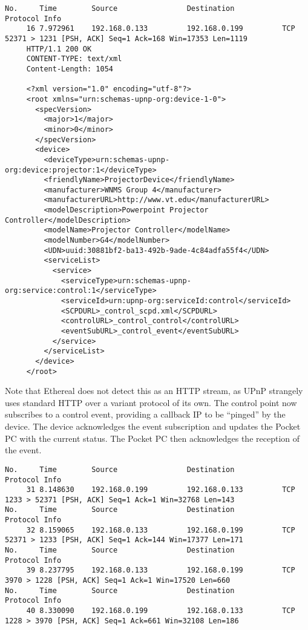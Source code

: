 \documentclass[11pt]{report}
\begin{document}
\begin{verbatim}
No.     Time        Source                Destination           Protocol Info
     16 7.972961    192.168.0.133         192.168.0.199         TCP      52371 > 1231 [PSH, ACK] Seq=1 Ack=168 Win=17353 Len=1119
     HTTP/1.1 200 OK
     CONTENT-TYPE: text/xml
     Content-Length: 1054

     <?xml version="1.0" encoding="utf-8"?>
     <root xmlns="urn:schemas-upnp-org:device-1-0">
       <specVersion>
         <major>1</major>
         <minor>0</minor>
       </specVersion>
       <device>
         <deviceType>urn:schemas-upnp-org:device:projector:1</deviceType>
         <friendlyName>ProjectorDevice</friendlyName>
         <manufacturer>WNMS Group 4</manufacturer>
         <manufacturerURL>http://www.vt.edu</manufacturerURL>
         <modelDescription>Powerpoint Projector Controller</modelDescription>
         <modelName>Projector Controller</modelName>
         <modelNumber>G4</modelNumber>
         <UDN>uuid:30881bf2-ba13-492b-9ade-4c84adfa55f4</UDN>
         <serviceList>
           <service>
             <serviceType>urn:schemas-upnp-org:service:control:1</serviceType>
             <serviceId>urn:upnp-org:serviceId:control</serviceId>
             <SCPDURL>_control_scpd.xml</SCPDURL>
             <controlURL>_control_control</controlURL>
             <eventSubURL>_control_event</eventSubURL>
           </service>
         </serviceList>
       </device>
     </root>
\end{verbatim}

Note that Ethereal does not detect this as an HTTP stream, as UPnP strangely uses standard HTTP over a variant protocol of its own. The control point now subscribes to a control event, providing a callback IP to be ``pinged'' by the device. The device acknowledges the event subscription and updates the Pocket PC with the current status. The Pocket PC then acknowledges the reception of the event.

\begin{verbatim}
No.     Time        Source                Destination           Protocol Info
     31 8.148630    192.168.0.199         192.168.0.133         TCP      1233 > 52371 [PSH, ACK] Seq=1 Ack=1 Win=32768 Len=143
No.     Time        Source                Destination           Protocol Info
     32 8.159065    192.168.0.133         192.168.0.199         TCP      52371 > 1233 [PSH, ACK] Seq=1 Ack=144 Win=17377 Len=171
No.     Time        Source                Destination           Protocol Info
     39 8.237795    192.168.0.133         192.168.0.199         TCP      3970 > 1228 [PSH, ACK] Seq=1 Ack=1 Win=17520 Len=660
No.     Time        Source                Destination           Protocol Info
     40 8.330090    192.168.0.199         192.168.0.133         TCP      1228 > 3970 [PSH, ACK] Seq=1 Ack=661 Win=32108 Len=186
\end{verbatim}
\end{document}
